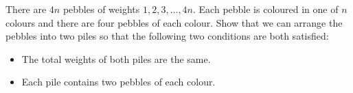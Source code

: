 There are $4n$ pebbles of weights $1, 2, 3, \dots, 4n.$ Each pebble is coloured in one of $n$ colours and there are four pebbles of each colour. Show that we can arrange the pebbles into two piles so that the following two conditions are both satisfied:
\begin{itemize}
	\item The total weights of both piles are the same.
	\item Each pile contains two pebbles of each colour.
\end{itemize}
